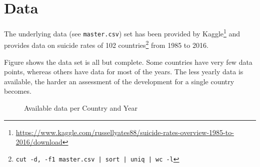 \section{Data}

The underlying data (see \texttt{master.csv}) set has been provided by Kaggle\footnote{\url{https://www.kaggle.com/russellyates88/suicide-rates-overview-1985-to-2016/download}} and provides data on suicide rates of 102 countries\footnote{\texttt{cut -d, -f1 master.csv | sort | uniq | wc -l}} from 1985 to 2016.

Figure  shows the data set is all but complete. Some countries have very few data points, whereas others have data for most of the years. The less yearly data is available, the harder an assessment of the development for a single country becomes.

\begin{figure}
    \centering
    \caption{Available data per Country and Year}
    \label{fig:available-data}
\end{figure}
